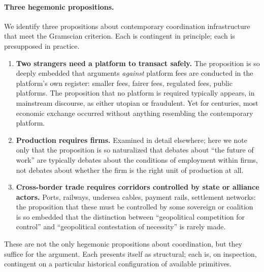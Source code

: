 \documentclass[11pt,a4paper]{article}
\theoremstyle{remark}
\begin{document}
\paragraph{Three hegemonic propositions.}
We identify three propositions about contemporary coordination
infrastructure that meet the Gramscian criterion. Each is
contingent in principle; each is presupposed in practice.

\begin{enumerate}
  \item \textbf{Two strangers need a platform to transact safely.}
    The proposition is so deeply embedded that arguments
    \emph{against} platform fees are conducted in the platform's
    own register: smaller fees, fairer fees, regulated fees, public
    platforms. The proposition that no platform is required
    typically appears, in mainstream discourse, as either utopian
    or fraudulent. Yet for centuries, most economic exchange
    occurred without anything resembling the contemporary platform.
  \item \textbf{Production requires firms.}
    Examined in detail elsewhere; here we note only that the
    proposition is so naturalized that
    debates about ``the future of work'' are typically debates
    about the conditions of employment within firms, not debates
    about whether the firm is the right unit of production at all.
  \item \textbf{Cross-border trade requires corridors controlled by
    state or alliance actors.} Ports, railways, undersea cables,
    payment rails, settlement networks: the proposition that these
    must be controlled by some sovereign or coalition is so
    embedded that the distinction between ``geopolitical
    competition for control'' and ``geopolitical contestation of
    necessity'' is rarely made.
\end{enumerate}

These are not the only hegemonic propositions about coordination,
but they suffice for the argument. Each presents itself as
structural; each is, on inspection, contingent on a particular
historical configuration of available primitives.
\end{document}
